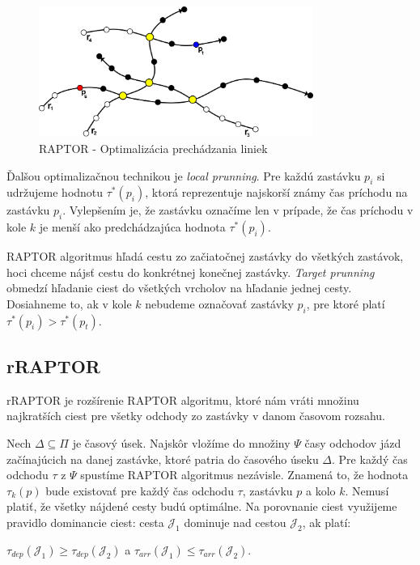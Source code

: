 \begin{figure}[H]
\centerline{\includegraphics[width=0.8\textwidth]{images/raptor-optimal}}
\caption[RAPTOR - Optimalizácia prechádzania liniek]{RAPTOR - Optimalizácia prechádzania liniek}
\label{fig:raptor-optimal}
\end{figure}

Ďalšou optimalizačnou technikou je \textit{local prunning}. Pre každú zastávku $p_i$ si udržujeme hodnotu $\tau^*(p_i)$, ktorá reprezentuje najskorší známy čas príchodu na zastávku $p_i$. Vylepšením je, že zastávku označíme len v prípade, že čas príchodu v kole $k$ je menší ako predchádzajúca hodnota $\tau^*(p_i)$. 

RAPTOR algoritmus hľadá cestu zo začiatočnej zastávky do všetkých zastávok, hoci chceme nájsť cestu do konkrétnej konečnej zastávky. \textit{Target prunning} obmedzí hľadanie ciest do všetkých vrcholov na hľadanie jednej cesty. Dosiahneme to, ak v kole $k$ nebudeme označovať zastávky $p_i$, pre ktoré platí $\tau^*(p_i) > \tau^*(p_t)$.   

\subsection{rRAPTOR}
\label{sub:rraptor}
rRAPTOR je rozšírenie RAPTOR algoritmu, ktoré nám vráti množinu najkratších ciest pre všetky odchody zo zastávky v danom časovom rozsahu. 

Nech $\Delta \subseteq \Pi$ je časový úsek. Najskôr vložíme do množiny $\Psi$ časy odchodov jázd začínajúcich na danej zastávke, ktoré patria do časového úseku $\Delta$. Pre každý čas odchodu $\tau$ z $\Psi$ spustíme RAPTOR algoritmus nezávisle. Znamená to, že hodnota $\tau_k(p)$ bude existovať pre každý čas odchodu $\tau$, zastávku $p$ a kolo $k$. Nemusí platiť, že všetky nájdené cesty budú optimálne. Na porovnanie ciest využijeme pravidlo dominancie ciest: cesta $\mathcal{J}_1$ dominuje nad cestou $\mathcal{J}_2$, ak platí:

$\tau_{dep}(\mathcal{J}_1) \geq \tau_{dep}(\mathcal{J}_2)$ a $\tau_{arr}(\mathcal{J}_1) \leq \tau_{arr}(\mathcal{J}_2)$. 


